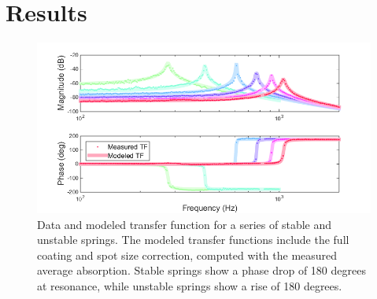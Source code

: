 




\section{Results}
\label{sec:res}

\begin{figure}[thb]%
\centering
\includegraphics[width=.7\paperwidth]{figures/photothermal/newOSfit.png}%
\caption{Data and modeled transfer function for a series of stable and unstable springs. The modeled transfer functions include the full coating and spot size correction, computed with the measured average absorption. Stable springs show a phase drop of 180 degrees at resonance, while unstable springs show a rise of 180 degrees.}%
\label{fig:springs}%
\end{figure}

